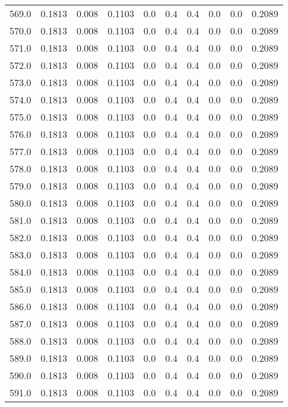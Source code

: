 \begin{longtable}{lrrrrrrrrr}
569.0 & 0.1813 & 0.008 & 0.1103 & 0.0 & 0.4 & 0.4 & 0.0 & 0.0 & 0.2089 \\
570.0 & 0.1813 & 0.008 & 0.1103 & 0.0 & 0.4 & 0.4 & 0.0 & 0.0 & 0.2089 \\
571.0 & 0.1813 & 0.008 & 0.1103 & 0.0 & 0.4 & 0.4 & 0.0 & 0.0 & 0.2089 \\
572.0 & 0.1813 & 0.008 & 0.1103 & 0.0 & 0.4 & 0.4 & 0.0 & 0.0 & 0.2089 \\
573.0 & 0.1813 & 0.008 & 0.1103 & 0.0 & 0.4 & 0.4 & 0.0 & 0.0 & 0.2089 \\
574.0 & 0.1813 & 0.008 & 0.1103 & 0.0 & 0.4 & 0.4 & 0.0 & 0.0 & 0.2089 \\
575.0 & 0.1813 & 0.008 & 0.1103 & 0.0 & 0.4 & 0.4 & 0.0 & 0.0 & 0.2089 \\
576.0 & 0.1813 & 0.008 & 0.1103 & 0.0 & 0.4 & 0.4 & 0.0 & 0.0 & 0.2089 \\
577.0 & 0.1813 & 0.008 & 0.1103 & 0.0 & 0.4 & 0.4 & 0.0 & 0.0 & 0.2089 \\
578.0 & 0.1813 & 0.008 & 0.1103 & 0.0 & 0.4 & 0.4 & 0.0 & 0.0 & 0.2089 \\
579.0 & 0.1813 & 0.008 & 0.1103 & 0.0 & 0.4 & 0.4 & 0.0 & 0.0 & 0.2089 \\
580.0 & 0.1813 & 0.008 & 0.1103 & 0.0 & 0.4 & 0.4 & 0.0 & 0.0 & 0.2089 \\
581.0 & 0.1813 & 0.008 & 0.1103 & 0.0 & 0.4 & 0.4 & 0.0 & 0.0 & 0.2089 \\
582.0 & 0.1813 & 0.008 & 0.1103 & 0.0 & 0.4 & 0.4 & 0.0 & 0.0 & 0.2089 \\
583.0 & 0.1813 & 0.008 & 0.1103 & 0.0 & 0.4 & 0.4 & 0.0 & 0.0 & 0.2089 \\
584.0 & 0.1813 & 0.008 & 0.1103 & 0.0 & 0.4 & 0.4 & 0.0 & 0.0 & 0.2089 \\
585.0 & 0.1813 & 0.008 & 0.1103 & 0.0 & 0.4 & 0.4 & 0.0 & 0.0 & 0.2089 \\
586.0 & 0.1813 & 0.008 & 0.1103 & 0.0 & 0.4 & 0.4 & 0.0 & 0.0 & 0.2089 \\
587.0 & 0.1813 & 0.008 & 0.1103 & 0.0 & 0.4 & 0.4 & 0.0 & 0.0 & 0.2089 \\
588.0 & 0.1813 & 0.008 & 0.1103 & 0.0 & 0.4 & 0.4 & 0.0 & 0.0 & 0.2089 \\
589.0 & 0.1813 & 0.008 & 0.1103 & 0.0 & 0.4 & 0.4 & 0.0 & 0.0 & 0.2089 \\
590.0 & 0.1813 & 0.008 & 0.1103 & 0.0 & 0.4 & 0.4 & 0.0 & 0.0 & 0.2089 \\
591.0 & 0.1813 & 0.008 & 0.1103 & 0.0 & 0.4 & 0.4 & 0.0 & 0.0 & 0.2089 \\

\end{longtable}
